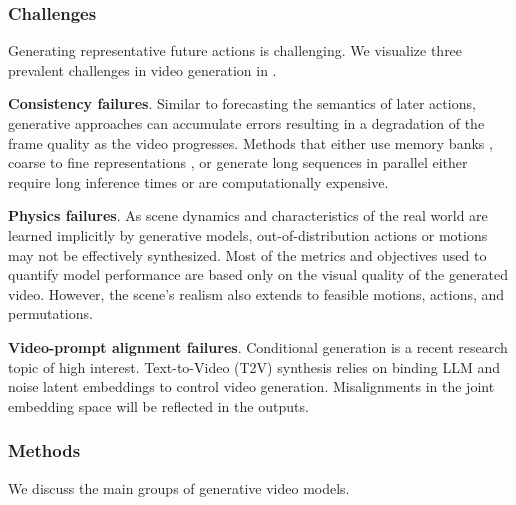 \subsubsection{Challenges}

Generating representative future actions is challenging. We visualize three prevalent challenges in video generation in .

\noindent
\textbf{Consistency failures}. Similar to forecasting the semantics of later actions, generative approaches can accumulate errors resulting in a degradation of the frame quality as the video progresses. Methods that either use memory banks \citep{oshima2024ssm}, coarse to fine representations \citep{yin2023nuwa}, or generate long sequences in parallel \citep{zhuang2024vlogger} either require long inference times or are computationally expensive.

\noindent
\textbf{Physics failures}. As scene dynamics and characteristics of the real world are learned implicitly by generative models, out-of-distribution actions or motions may not be effectively synthesized. Most of the metrics and objectives used to quantify model performance are based only on the visual quality of the generated video. However, the scene's realism also extends to feasible motions, actions, and permutations.

\noindent
\textbf{Video-prompt alignment failures}. Conditional generation is a recent research topic of high interest. Text-to-Video (T2V) synthesis relies on binding LLM and noise latent embeddings to control video generation. Misalignments in the joint embedding space will be reflected in the outputs.



\subsubsection{Methods}

We discuss the main groups of generative video models.

